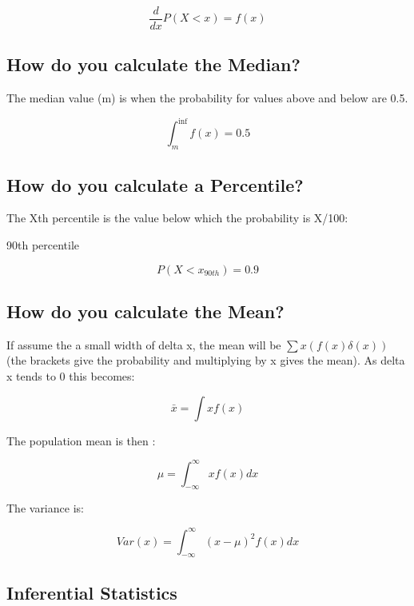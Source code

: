 \documentclass[11pt]{scrartcl} %
\begin{document}
\begin{equation}
	\frac{d}{dx}P(X<x) = f(x)
\end{equation}

\subsection{How do you calculate the
Median?}

The median value (m) is when the probability for values above and below
are 0.5.

\begin{equation}
	\int_{m}^{\inf} f(x) = 0.5
\end{equation}

\subsection{How do you calculate a
Percentile?}

The Xth percentile is the value below which the probability is X/100:

90th percentile

\begin{equation}
	P(X<x_{90th}) = 0.9
\end{equation}

\subsection{How do you calculate the
Mean?}

If assume the a small width of delta x, the mean will be
\(\sum x(f(x)\delta(x))\) (the brackets give the probability and
multiplying by x gives the mean). As delta x tends to 0 this becomes:

\begin{equation}
	\bar{x} = \int xf(x)
\end{equation}

The population mean is then :

\begin{equation}
	\mu = \int_{-\infty}^{\infty} xf(x) dx
\end{equation}

The variance is:

\begin{equation}
	Var(x) = \int_{-\infty}^{\infty} (x -\mu)^2 f(x) dx
\end{equation}

\subsection{Inferential Statistics}
\end{document}
